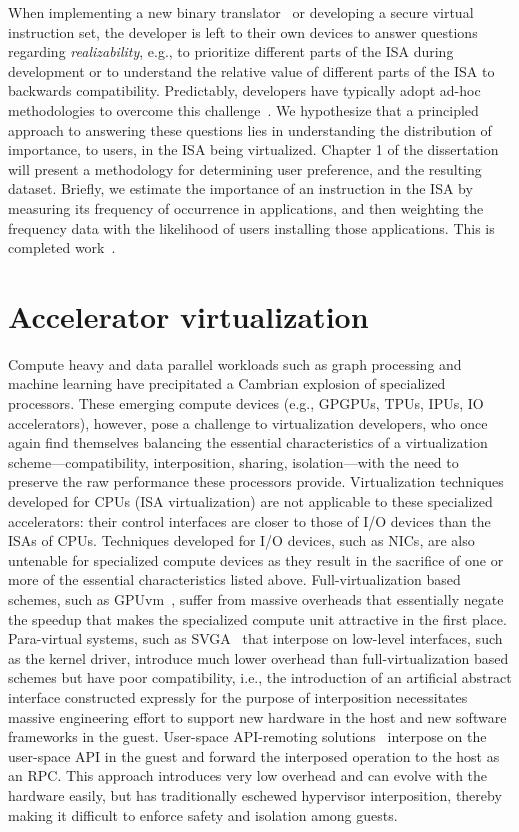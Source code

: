 When implementing a new binary translator~\cite{HVX} or developing a
secure virtual instruction set, the developer is left to
their own devices to answer questions regarding \emph{realizability}, e.g., to
prioritize different parts of the ISA during development or to understand the
relative value of different parts of the ISA to backwards compatibility.
Predictably, developers have typically adopt ad-hoc methodologies to overcome
this challenge~\cite{bugnion-workstation}. We hypothesize that a principled
approach to answering these questions lies in understanding the distribution
of importance, to users, in the ISA being virtualized. Chapter 1 of the
dissertation will present a methodology for determining user preference, and
the resulting dataset.
Briefly, we estimate the importance of an instruction in the ISA by measuring
its frequency of occurrence in applications, and then weighting the frequency
data with the likelihood of users installing those applications. This is
completed work~\cite{x86-systor}.

\section{Accelerator virtualization}
Compute heavy and data parallel workloads such as graph processing and machine
learning have precipitated a Cambrian explosion of specialized processors.
These emerging compute devices (e.g., GPGPUs, TPUs, IPUs, IO accelerators),
however, pose a challenge to virtualization developers, who once again find
themselves balancing the essential characteristics of a virtualization
scheme---compatibility, interposition, sharing, isolation---with the need to
preserve the raw performance these processors provide. Virtualization
techniques developed for CPUs (ISA virtualization) are not applicable to these
specialized accelerators: their control interfaces are closer to those of I/O
devices than the ISAs of CPUs.
Techniques developed for I/O devices, such as NICs, are also untenable for
specialized compute devices as they result in the sacrifice of one or more of
the essential characteristics listed above.
Full-virtualization based schemes, such as GPUvm~\cite{suzuki2014gpuvm},
suffer from massive overheads that essentially negate the speedup that makes
the specialized compute unit attractive in the first place.
Para-virtual systems, such as SVGA~\cite{dowty2009gpu} that interpose on
low-level interfaces, such as the kernel driver, introduce much lower overhead
than full-virtualization based schemes but have poor compatibility, i.e., the
introduction of an artificial abstract interface constructed expressly for the
purpose of interposition necessitates massive engineering effort to support
new hardware in the host and new software frameworks in the guest.
User-space API-remoting solutions~\cite{vmCUDA,rCUDA,rCUDAnew} interpose on
the user-space API in the guest and forward the interposed operation to the
host as an RPC. This approach introduces very low overhead and can evolve with
the hardware easily, but has traditionally eschewed hypervisor interposition,
thereby making it difficult to enforce safety and isolation among guests.

